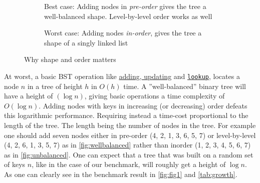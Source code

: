 \documentclass[a4paper, 11pt]{article}
\begin{document}
    \begin{figure}[h]
        \centering
        \begin{subfigure}[h]{0.45\textwidth}
            \centering
{}
            \caption{Best case: 
            Adding nodes in \emph{pre-order} gives the tree a well-balanced shape.
            Level-by-level order works as well}
            \label{fig:wellbalanced}
        \end{subfigure}
        \begin{subfigure}[h]{0.45\textwidth}
            \centering
{}
            \caption{Worst case:
            Adding nodes \emph{in-order}, gives the tree a shape of a singly
            linked list}
            \label{fig:unbalanced}
        \end{subfigure}
        \caption{Why shape and order matters}
        \label{bstshape}
    \end{figure}
    At worst, a basic BST operation like \hyperref[sec:adding]{adding, updating} 
    and \hyperref[sec:lookup]{\texttt{lookup}}, locates a node $n$ in a tree
    of height $h$ in $O(h)$ time. 
    A ''well-balanced'' binary tree will have a height of $(\log n)$, 
    giving basic operations a time complexity of $O(\log n)$.
    Adding nodes with keys in increasing (or decreasing) order 
    defeats this logarithmic performance. Requiring instead a 
    time-cost proportional to the length of the tree. The length being the
    number of nodes in the tree. 
    For example one should add seven nodes either in 
    pre-order (4, 2, 1, 3, 6, 5, 7) or
    level-by-level (4, 2, 6, 1, 3, 5, 7) as in \autoref{fig:wellbalanced}
    rather than inorder (1, 2, 3, 4, 5, 6, 7) as in \autoref{fig:unbalanced}.
    One can expect that a tree that was built on a random set of keys $n$,
    like in the case of our benchmark, 
    will roughly get a height of $\log n$. As one can clearly see in the benchmark 
    result in \autoref{fig:fig1} and \autoref{tab:growth}.
\end{document}
